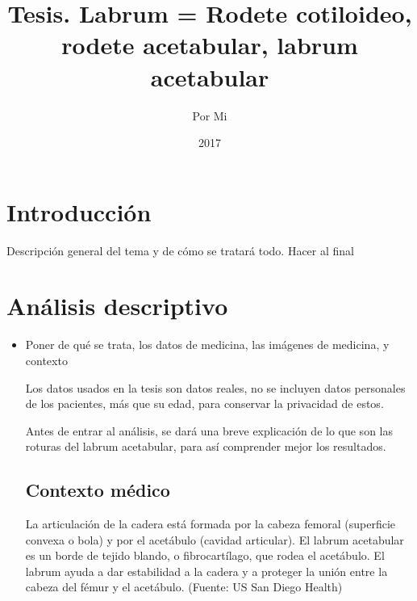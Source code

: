 \documentclass{article}
\title{Tesis. Labrum = Rodete cotiloideo, rodete acetabular, labrum acetabular}
\author{Por Mi}
\date{2017}
\begin{document}
	
\maketitle	
	\section{Introducción}  
	Descripción general del tema y de cómo se tratará todo. Hacer al final
	
	\section{Análisis descriptivo} 
		\begin{itemize}
			\item Poner de qué se trata, los datos de medicina, las imágenes de medicina, y contexto
			
			Los datos usados en la tesis son datos reales, no se incluyen datos personales de los pacientes, más que su edad, para conservar la privacidad de estos. 
			
			
			
			Antes de entrar al análisis, se dará una breve explicación de lo que son las roturas del labrum acetabular, para así comprender mejor los resultados.
			
	        \subsection{Contexto médico}
	        La articulación de la cadera está formada por la cabeza femoral (superficie convexa o bola) y por el acetábulo (cavidad articular). El labrum acetabular es un borde de tejido blando, o fibrocartílago, que rodea el acetábulo. El labrum ayuda a dar estabilidad a la cadera y a proteger la unión entre la cabeza del fémur y el acetábulo. (Fuente: US San Diego Health) 
	        

\end{itemize}
\end{document}
